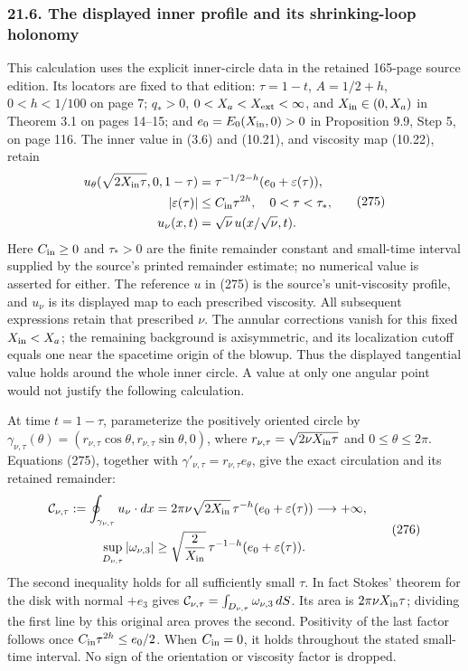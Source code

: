 \documentclass[
  11pt,
]{article}
\begin{document}
\subsubsection{21.6. The displayed inner profile and its shrinking-loop
holonomy}\label{the-displayed-inner-profile-and-its-shrinking-loop-holonomy}

This calculation uses the explicit inner-circle data in the retained
165-page source edition. Its locators are fixed to that edition:
\(\tau=1-t\), \(A=1/2+h\), \(0<h<1/100\) on page 7; \(q_*>0\),
\(0<X_a<X_{\rm ext}<\infty\), and \(X_{\rm in}\in(0,X_a)\) in Theorem
3.1 on pages 14--15; and \(e_0=E_0(X_{\rm in},0)>0\) in Proposition 9.9,
Step 5, on page 116. The inner value in (3.6) and (10.21), and viscosity
map (10.22), retain \[
 \begin{split}
 u_\theta(\sqrt{2X_{\rm in}\tau},0,1-\tau)
   &=\tau^{-1/2-h}(e_0+\varepsilon(\tau)),\\
 |\varepsilon(\tau)|&\le C_{\rm in}\tau^{2h},
       \quad 0<\tau<\tau_*,\\
 u_\nu(x,t)&=\sqrt{\nu}\,u(x/\sqrt{\nu},t).
 \end{split}
 \tag{275}
\] Here \(C_{\rm in}\ge0\) and \(\tau_*>0\) are the finite remainder
constant and small-time interval supplied by the source's printed
remainder estimate; no numerical value is asserted for either. The
reference \(u\) in (275) is the source's unit-viscosity profile, and
\(u_\nu\) is its displayed map to each prescribed viscosity. All
subsequent expressions retain that prescribed \(\nu\). The annular
corrections vanish for this fixed \(X_{\rm in}<X_a\); the remaining
background is axisymmetric, and its localization cutoff equals one near
the spacetime origin of the blowup. Thus the displayed tangential value
holds around the whole inner circle. A value at only one angular point
would not justify the following calculation.

At time \(t=1-\tau\), parameterize the positively oriented circle by
\(\gamma_{\nu,\tau}(\theta)=
(r_{\nu,\tau}\cos\theta,r_{\nu,\tau}\sin\theta,0)\), where
\(r_{\nu,\tau}=\sqrt{2\nu X_{\rm in}\tau}\) and \(0\le\theta\le2\pi\).
Equations (275), together with
\(\gamma'_{\nu,\tau}=r_{\nu,\tau}e_\theta\), give the exact circulation
and its retained remainder: \[
 \begin{split}
 {\cal C}_{\nu,\tau}
   :=\oint_{\gamma_{\nu,\tau}}u_\nu\cdot dx
   &=2\pi\nu\sqrt{2X_{\rm in}}\,
       \tau^{-h}(e_0+\varepsilon(\tau))
       \longrightarrow+\infty,\\
 \sup_{D_{\nu,\tau}}|\omega_{\nu,3}|
   &\ge\sqrt{\frac{2}{X_{\rm in}}}\,
       \tau^{-1-h}(e_0+\varepsilon(\tau)).
 \end{split}
 \tag{276}
\] The second inequality holds for all sufficiently small \(\tau\). In
fact Stokes' theorem for the disk with normal \(+e_3\) gives
\({\cal C}_{\nu,\tau}=\int_{D_{\nu,\tau}}\omega_{\nu,3}\,dS\). Its area
is \(2\pi\nu X_{\rm in}\tau\); dividing the first line by this original
area proves the second. Positivity of the last factor follows once
\(C_{\rm in}\tau^{2h}\le e_0/2\). When \(C_{\rm in}=0\), it holds
throughout the stated small-time interval. No sign of the orientation or
viscosity factor is dropped.
\end{document}
